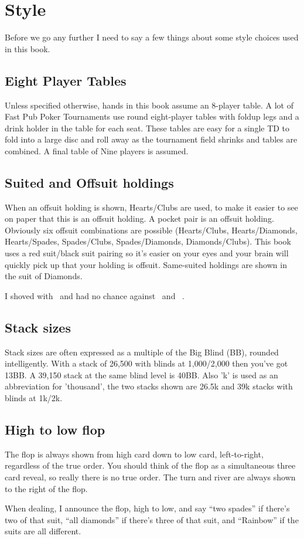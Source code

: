 \chapter{Style}


Before we go any further I need to say a few things about
some style choices used in this book.

\section*{Eight Player Tables}

Unless specified otherwise, hands in this book assume an
8-player table. A lot of Fast Pub Poker Tournaments use
round eight-player tables with foldup legs and a drink holder
in the table for each seat. These tables are easy for a single TD
to fold into a large disc and roll away as the tournament
field shrinks and tables are combined. A final table of Nine players
is assumed.

\section*{Suited and Offsuit holdings}

When an offsuit holding is shown, Hearts/Clubs are used, to make
it easier to see on paper that this is an offsuit holding. A pocket
pair is an offsuit holding. Obviously six offsuit combinations are
possible (Hearts/Clubs, Hearts/Diamonds, Hearts/Spades, Spades/Clubs,
Spades/Diamonds, Diamonds/Clubs). This book uses a red suit/black suit
pairing so it's easier on your eyes and your brain will quickly pick
up that your holding is offsuit. Same-suited
holdings are shown in the suit of Diamonds.

I shoved with \Ah\tenc\ and had no chance against \Ad\Kd\ and \Jh\Jc\ .

\section*{Stack sizes}

Stack sizes are often expressed as a multiple of the Big Blind (BB),
rounded intelligently. With a stack of 26,500 with blinds at 1,000/2,000
then you've got 13BB. A 39,150 stack at the same blind level is 40BB.
Also 'k' is used as an abbreviation for 'thousand', the two stacks
shown are 26.5k and 39k stacks with blinds at 1k/2k.

\section*{High to low flop}

The flop is always shown from high card down to low card, left-to-right,
regardless of the true order. You should think of the flop as a
simultaneous three card reveal, so really there is no true order. The turn
and river are always shown to the right of the flop.

When dealing, I announce the flop, high to low, and say ``two spades''
if there's two of that suit, ``all diamonds'' if there's three of that
suit, and ``Rainbow'' if the suits are all different.

